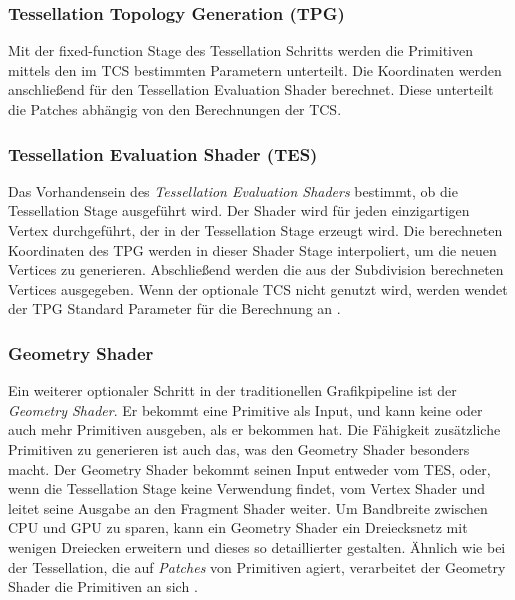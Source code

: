 \subsubsection*{Tessellation Topology Generation (TPG)}
Mit der fixed-function Stage des Tessellation Schritts werden die Primitiven mittels den im TCS bestimmten Parametern unterteilt.
Die Koordinaten werden anschließend für den Tessellation Evaluation Shader berechnet.
Diese unterteilt die Patches abhängig von den Berechnungen der TCS.

\subsubsection*{Tessellation Evaluation Shader (TES)}
Das Vorhandensein des \textit{Tessellation Evaluation Shaders} bestimmt, ob die Tessellation Stage ausgeführt wird.
Der Shader wird für jeden einzigartigen Vertex durchgeführt, der in der Tessellation Stage erzeugt wird.
Die berechneten Koordinaten des TPG werden in dieser Shader Stage interpoliert, um die neuen Vertices zu generieren.
Abschließend werden die aus der Subdivision berechneten Vertices ausgegeben. 
Wenn der optionale TCS nicht genutzt wird, werden wendet der TPG Standard Parameter für die Berechnung an \cite{cozzi2012opengl}\cite{Carvalho2022}.

\subsubsection{Geometry Shader}
\label{subsubsec:geometry_shader}
Ein weiterer optionaler Schritt in der traditionellen Grafikpipeline ist der \textit{Geometry Shader}.
Er bekommt eine Primitive als Input, und kann keine oder auch mehr Primitiven ausgeben, als er bekommen hat.
Die Fähigkeit zusätzliche Primitiven zu generieren ist auch das, was den Geometry Shader besonders macht.
Der Geometry Shader bekommt seinen Input entweder vom TES, oder, wenn die Tessellation Stage keine Verwendung findet, vom Vertex Shader und leitet seine Ausgabe an den Fragment Shader weiter.
Um Bandbreite zwischen CPU und GPU zu sparen, kann ein Geometry Shader ein Dreiecksnetz mit wenigen Dreiecken erweitern und dieses so detaillierter gestalten.
Ähnlich wie bei der Tessellation, die auf \textit{Patches} von Primitiven agiert, verarbeitet der Geometry Shader die Primitiven an sich \cite{Chang2014}.

